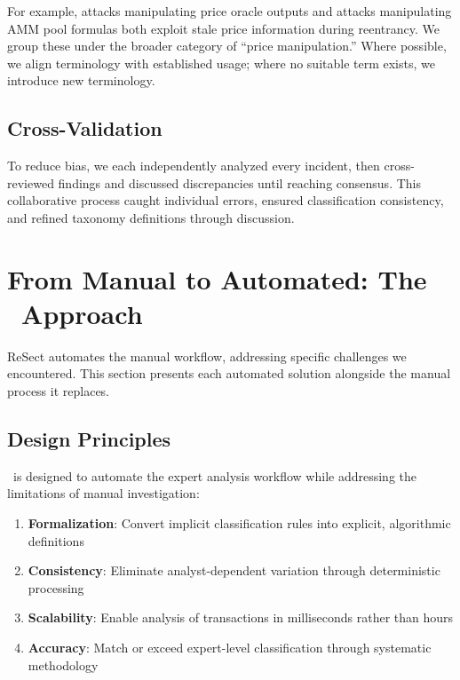 For example, attacks manipulating price oracle outputs and attacks manipulating AMM pool formulas both exploit stale price information during reentrancy. We group these under the broader category of ``price manipulation.'' Where possible, we align terminology with established usage; where no suitable term exists, we introduce new terminology.

\subsection{Cross-Validation}
\label{sec:meth-crossval}

To reduce bias, we each independently analyzed every incident, then cross-reviewed findings and discussed discrepancies until reaching consensus. This collaborative process caught individual errors, ensured classification consistency, and refined taxonomy definitions through discussion.

\section{From Manual to Automated: The \ToolName\ Approach}
\label{sec:meth-automated}

ReSect automates the manual workflow, addressing specific challenges we encountered. This section presents each automated solution alongside the manual process it replaces.

\subsection{Design Principles}

\ToolName\ is designed to automate the expert analysis workflow while addressing the limitations of manual investigation:

\begin{enumerate}
    \item \textbf{Formalization}: Convert implicit classification rules into explicit, algorithmic definitions
    \item \textbf{Consistency}: Eliminate analyst-dependent variation through deterministic processing  
    \item \textbf{Scalability}: Enable analysis of transactions in milliseconds rather than hours
    \item \textbf{Accuracy}: Match or exceed expert-level classification through systematic methodology
\end{enumerate}

